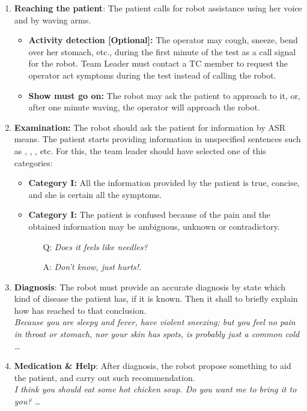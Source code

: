 \begin{enumerate}
\item \textbf{Reaching the patient}: The patient calls for robot assistance using her voice and by waving arms.
\begin{itemize}
\item \textbf{Activity detection [Optional]:} The operator may cough, sneeze, bend over her stomach, etc., during the first minute of the test as a call signal for the robot. Team Leader must contact a TC member to request the operator act symptoms during the test instead of calling the robot.
\item \textbf{Show must go on:} The robot may ask the patient to approach to it, or, after one minute waving, the operator will approach the robot.
\end{itemize}
 
\item \textbf{Examination:} The robot should ask the patient for information by ASR means. The patient starts providing information in unspecified sentences such as , , ,  etc. For this, the team leader should have selected one of this categories:
\begin{itemize}
\item \textbf{Category I:} All the information provided by the patient is true, concise, and she is certain all the symptoms.
\item \textbf{Category I:} The patient is confused because of the pain and the obtained information  may be ambiguous, unknown or contradictory. %
\begin{itemize}
\item[Q:] \textit{Does it feels like needles?}
\item[A:] \textit{Don't know, just hurts!.}
\end{itemize}
\end{itemize}

\item \textbf{Diagnosis}: The robot must provide an accurate diagnosis by state which kind of disease the patient has, if it is known. Then it shall to briefly explain how has reached to that conclusion. \\ \textit{Because you are sleepy and fever, have violent sneezing; but you feel no pain in throat or stomach, nor your skin has spots, is probably just a common cold \dots}

\item \textbf{Medication \& Help}: After diagnosis, the robot propose something to aid the patient, and carry out such recommendation.\\ \textit{I think you should eat some hot chicken soup. Do you want me to bring it to you? \dots}
\end{enumerate}

